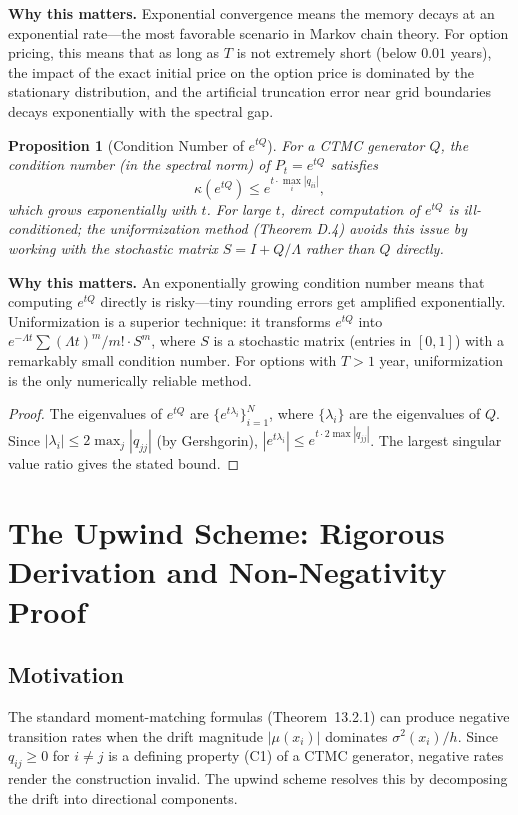 \documentclass[11pt,a4paper,openany]{book}
\theoremstyle{definition}
\theoremstyle{plain}
\newtheorem{proposition}[theorem]{Proposition}
\theoremstyle{remark}
\newcommand{\1}{\mathbbm{1}}
\begin{document}
\medskip
\noindent\textbf{Why this matters.} Exponential convergence means the memory decays at an exponential rate---the most favorable scenario in Markov chain theory. For option pricing, this means that as long as $T$ is not extremely short (below $0.01$ years), the impact of the exact initial price on the option price is dominated by the stationary distribution, and the artificial truncation error near grid boundaries decays exponentially with the spectral gap.

\begin{proposition}[Condition Number of $e^{tQ}$]
For a CTMC generator $Q$, the condition number (in the spectral norm) of $P_{t} = e^{tQ}$ satisfies
\[
\kappa(e^{tQ}) \leq e^{t \cdot \max_{i} |q_{ii}|},
\]
which grows exponentially with $t$. For large $t$, direct computation of $e^{tQ}$ is ill-conditioned; the uniformization method (Theorem D.4) avoids this issue by working with the stochastic matrix $S = I + Q/\Lambda$ rather than $Q$ directly.
\end{proposition}

\medskip
\noindent\textbf{Why this matters.} An exponentially growing condition number means that computing $e^{tQ}$ directly is risky---tiny rounding errors get amplified exponentially. Uniformization is a superior technique: it transforms $e^{tQ}$ into $e^{-\Lambda t}\sum (\Lambda t)^m/m! \cdot S^m$, where $S$ is a stochastic matrix (entries in $[0,1]$) with a remarkably small condition number. For options with $T > 1$ year, uniformization is the only numerically reliable method.

\begin{proof}
The eigenvalues of $e^{tQ}$ are $\{e^{t\lambda_{i}}\}_{i=1}^{N}$, where $\{\lambda_{i}\}$ are the eigenvalues of $Q$. Since $|\lambda_{i}| \leq 2 \max_{j} |q_{jj}|$ (by Gershgorin), $|e^{t\lambda_{i}}| \leq e^{t \cdot 2 \max |q_{jj}|}$. The largest singular value ratio gives the stated bound.
\end{proof}

\chapter{The Upwind Scheme: Rigorous Derivation and Non-Negativity Proof}
\label{app:upwind}

\section{Motivation}

The standard moment-matching formulas (Theorem~13.2.1) can produce negative transition rates when the drift magnitude $|\mu(x_{i})|$ dominates $\sigma^{2}(x_{i})/h$. Since $q_{ij} \geq 0$ for $i \neq j$ is a defining property (C1) of a CTMC generator, negative rates render the construction invalid. The upwind scheme resolves this by decomposing the drift into directional components.
\end{document}
